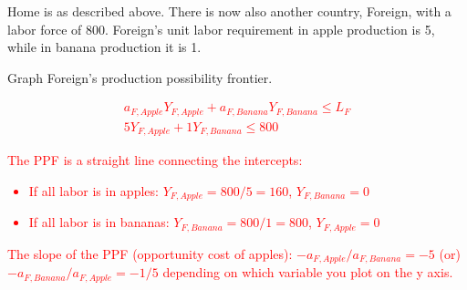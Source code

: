 \documentclass[11pt,letterpaper]{exam}
\begin{document}
\begin{questions}
\question Home is as described above. There is now also another country, Foreign,
with a labor force of 800. Foreign’s unit labor requirement in apple production
is 5, while in banana production it is 1.
\begin{parts}
    \item Graph Foreign’s production possibility frontier.

    \textcolor{red}{
    \begin{align*}
        a_{F,Apple} Y_{F,Apple} + a_{F,Banana} Y_{F,Banana} \leq L_{F} \\
        5 Y_{F,Apple} + 1 Y_{F,Banana} \leq 800
    \end{align*}
    }
    \textcolor{red}{
    The PPF is a straight line connecting the intercepts:
    \begin{itemize}
        \item If all labor is in apples: $Y_{F,Apple} = 800/5 = 160$, $Y_{F,Banana} = 0$
        \item If all labor is in bananas: $Y_{F,Banana} = 800/1 = 800$, $Y_{F,Apple} = 0$
    \end{itemize}
    The slope of the PPF (opportunity cost of apples): $-a_{F,Apple}/a_{F,Banana} = -5$ (or) $-a_{F,Banana}/a_{F,Apple} = -1/5$ depending on which variable you plot on the y axis.
    }


\end{parts}
\end{questions}
\end{document}
